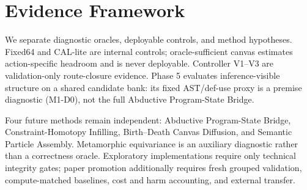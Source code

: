 \section{Evidence Framework}
We separate diagnostic oracles, deployable controls, and method hypotheses. Fixed64 and CAL-lite are internal controls; oracle-sufficient canvas estimates action-specific headroom and is never deployable. Controller V1--V3 are validation-only route-closure evidence. Phase 5 evaluates inference-visible structure on a shared candidate bank: its fixed AST/def-use proxy is a premise diagnostic (M1-D0), not the full Abductive Program-State Bridge.

Four future methods remain independent: Abductive Program-State Bridge, Constraint-Homotopy Infilling, Birth--Death Canvas Diffusion, and Semantic Particle Assembly. Metamorphic equivariance is an auxiliary diagnostic rather than a correctness oracle. Exploratory implementations require only technical integrity gates; paper promotion additionally requires fresh grouped validation, compute-matched baselines, cost and harm accounting, and external transfer.
